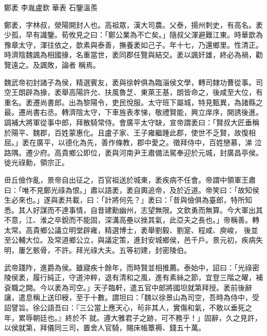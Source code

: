 
\begin{pinyinscope}
鄭袤
 李胤盧欽
 華表
 石鑒溫羨



 鄭袤，字林叔，滎陽開封人也。高祖眾，漢大司農。父泰，揚州刺史，有高名。袤少孤，早有識鑒。荀攸見之曰：「鄭公業為不亡矣。」隨叔父渾避難江東。時華歆為豫章太守，渾往依之，歆素與泰善，撫養袤如己子。年十七，乃還鄉里。性清正。時濟陰魏諷為相國掾，名重當世，袤同郡任覽與結交。袤以諷奸雄，終必為禍，勸覽遠之。及諷敗，論者
 稱焉。



 魏武帝初封諸子為侯，精選賓友，袤與徐幹俱為臨淄侯文學，轉司隸功曹從事。司空王朗辟為掾，袤舉高陽許允、扶風魯芝、東萊王基，朗皆命之，後咸至大位，有重名。袤遷尚書郎。出為黎陽令，吏民悅服。太守班下屬城，特見甄異，為諸縣之最。遷尚書右丞。轉濟陰太守，下車旌表孝悌，敬禮賢能，興立庠序，開誘後進。調補大將軍從事中郎，拜散騎常侍。會廣平太守缺，宣帝謂袤曰：「賢叔大匠垂稱於陽平、魏郡，百姓蒙惠化。且盧子家、王子雍繼踵此郡，使世不乏賢，故復相屈。」袤在廣平，以德化為先，善作條教，郡中愛之。徵拜侍中，百姓戀慕，涕
 泣路隅。遷少府。高貴鄉公即位，袤與河南尹王肅備法駕奉迎於元城，封廣昌亭侯。徙光祿勳，領宗正。



 毌丘儉作亂，景帝自出征之，百官祖送於城東，袤疾病不任會。帝謂中領軍王肅曰：「唯不見鄭光祿為恨。」肅以語袤，袤自輿追帝，及於近道。帝笑曰：「故知侯生必來也。」遂與袤共載，曰：「計將何先？」袤曰：「昔與儉俱為臺郎，特所知悉。其人好謀而不達事情，自昔建勳幽州，志望無限。文欽勇而無算。今大軍出其不意，江、淮之卒銳而不能固，深溝高壘以挫其氣，此亞夫之長也。」帝稱善。轉太常。高貴鄉公議立明堂辟雍，精選博士，袤舉劉毅、劉寔、程咸、庾峻，
 後並至公輔大位。及常道鄉公立，與議定策，進封安城鄉侯，邑千戶。景元初，疾病失明，屢乞骸骨，不許。拜光祿大夫。五等初建，封密陵伯。



 武帝踐阼，進爵為侯。雖寢疾十餘年，而時賢並相推薦。泰始中，詔曰：「光祿密陵侯袤，履行純正，守道沖粹，退有清和之風，進有素絲之節，宜登三階之曜，補袞職之闕。今以袤為司空。」天子臨軒，遣五官中郎將國坦就第拜授。袤前後辭讓，遣息稱上送印綬，至于十數。謂坦曰：「魏以徐景山為司空，吾時為侍中，受詔譬旨。徐公語吾曰：『三公當上應天心，茍非其人，實傷和氣，不敢以垂死之年，累辱朝廷也。』終於不
 就。遵大雅君子之跡，可不務乎！」固辭，久之見許，以侯就第，拜儀同三司，置舍人官騎，賜床帳簟褥、錢五十萬。




\end{pinyinscope}
